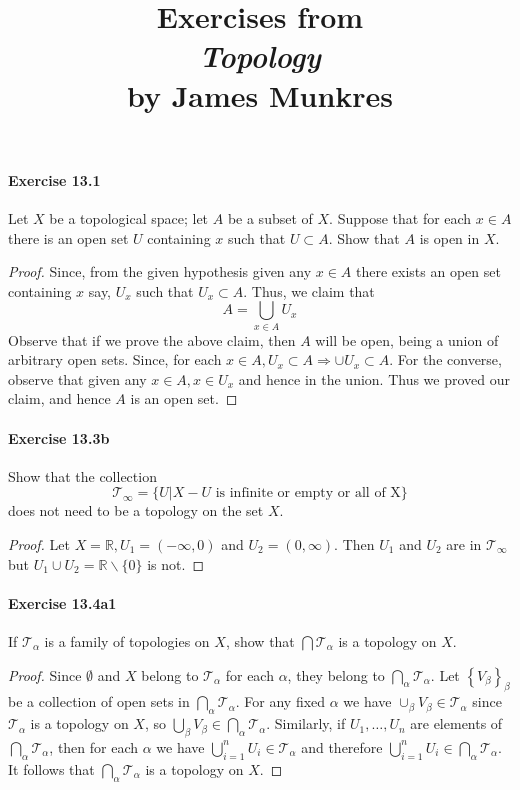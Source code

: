\documentclass{article}
\title{\textbf{
Exercises from \\
\textit{Topology} \\
by James Munkres
}}
\date{}
\begin{document}
\maketitle


\paragraph{Exercise 13.1} Let $X$ be a topological space; let $A$ be a subset of $X$. Suppose that for each $x \in A$ there is an open set $U$ containing $x$ such that $U \subset A$. Show that $A$ is open in $X$.
\begin{proof}
    Since, from the given hypothesis given any $x \in A$ there exists an open set containing $x$ say, $U_x$ such that $U_x \subset A$. Thus, we claim that
$$
A=\bigcup_{x \in A} U_x
$$
Observe that if we prove the above claim, then $A$ will be open, being a union of arbitrary open sets. Since, for each $x \in A, U_x \subset A \Longrightarrow \cup U_x \subset A$. For the converse, observe that given any $x \in A, x \in U_x$ and hence in the union. Thus we proved our claim, and hence $A$ is an open set.
\end{proof}



\paragraph{Exercise 13.3b} Show that the collection $$\mathcal{T}_\infty = \{U | X - U \text{ is infinite or empty or all of X}\}$$ does not need to be a topology on the set $X$.
\begin{proof}
    Let $X=\mathbb{R}, U_1=(-\infty, 0)$ and $U_2=(0, \infty)$. Then $U_1$ and $U_2$ are in $\mathcal{T}_{\infty}$ but $U_1 \cup U_2=\mathbb{R} \backslash\{0\}$ is not.
\end{proof}



\paragraph{Exercise 13.4a1} If $\mathcal{T}_\alpha$ is a family of topologies on $X$, show that $\bigcap \mathcal{T}_\alpha$ is a topology on $X$.
\begin{proof}
    Since $\emptyset$ and $X$ belong to $\mathcal{T}_\alpha$ for each $\alpha$, they belong to $\bigcap_\alpha \mathcal{T}_\alpha$. Let $\left\{V_\beta\right\}_\beta$ be a collection of open sets in $\bigcap_\alpha \mathcal{T}_\alpha$. For any fixed $\alpha$ we have $\cup_\beta V_\beta \in \mathcal{T}_\alpha$ since $\mathcal{T}_\alpha$ is a topology on $X$, so $\bigcup_\beta V_\beta \in \bigcap_\alpha \mathcal{T}_\alpha$. Similarly, if $U_1, \ldots, U_n$ are elements of $\bigcap_\alpha \mathcal{T}_\alpha$, then for each $\alpha$ we have $\bigcup_{i=1}^n U_i \in \mathcal{T}_\alpha$ and therefore $\bigcup_{i=1}^n U_i \in \bigcap_\alpha \mathcal{T}_\alpha$. It follows that $\bigcap_\alpha \mathcal{T}_\alpha$ is a topology on $X$.
\end{proof}
\end{document}
